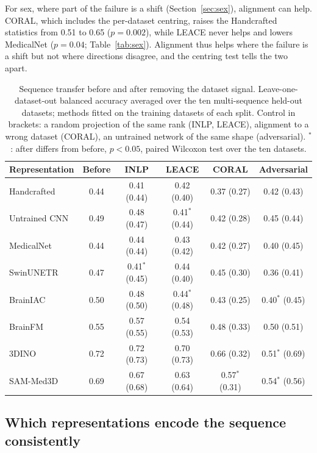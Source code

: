 \documentclass[11pt]{article}
\begin{document}
For sex, where part of the failure is a shift (Section~\ref{sec:sex}),
alignment can help. CORAL, which includes the per-dataset centring, raises
the Handcrafted statistics from 0.51 to 0.65 ($p=0.002$), while LEACE never
helps and lowers MedicalNet ($p=0.04$; Table~\ref{tab:sex}). Alignment thus
helps where the failure is a shift but not where directions disagree, and the
centring test tells the two apart.

\begin{table}[t]
\centering
\small
\caption{Sequence transfer before and after removing the dataset signal.
Leave-one-dataset-out balanced accuracy averaged over the ten multi-sequence
held-out datasets; methods fitted on the training datasets of each split.
Control in brackets: a random projection of the same rank (INLP, LEACE),
alignment to a wrong dataset (CORAL), an untrained network of the same shape
(adversarial). $^{*}$: after differs from before, $p<0.05$, paired Wilcoxon
test over the ten datasets.}
\label{tab:removal}
\begin{tabular}{l c c c c c}
\toprule
\textbf{Representation} & \textbf{Before} & \textbf{INLP} & \textbf{LEACE} & \textbf{CORAL} & \textbf{Adversarial} \\
\midrule
Handcrafted   & 0.44 & 0.41 (0.44) & 0.42 (0.40) & 0.37 (0.27) & 0.42 (0.43) \\
Untrained CNN & 0.49 & 0.48 (0.47) & 0.41$^{*}$ (0.44) & 0.42 (0.28) & 0.45 (0.44) \\
MedicalNet    & 0.44 & 0.44 (0.44) & 0.43 (0.42) & 0.42 (0.27) & 0.40 (0.45) \\
SwinUNETR     & 0.47 & 0.41$^{*}$ (0.45) & 0.44 (0.40) & 0.45 (0.30) & 0.36 (0.41) \\
\midrule
BrainIAC      & 0.50 & 0.48 (0.50) & 0.44$^{*}$ (0.48) & 0.43 (0.25) & 0.40$^{*}$ (0.45) \\
BrainFM       & 0.55 & 0.57 (0.55) & 0.54 (0.53) & 0.48 (0.33) & 0.50 (0.51) \\
\midrule
3DINO         & 0.72 & 0.72 (0.73) & 0.70 (0.73) & 0.66 (0.32) & 0.51$^{*}$ (0.69) \\
SAM-Med3D     & 0.69 & 0.67 (0.68) & 0.63 (0.64) & 0.57$^{*}$ (0.31) & 0.54$^{*}$ (0.56) \\
\bottomrule
\end{tabular}
\end{table}

\subsection{Which representations encode the sequence consistently}
\label{sec:models}
\end{document}
